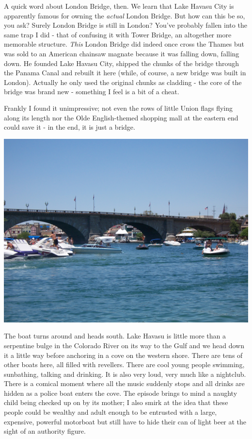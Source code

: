 \documentclass[a5paper,titlepage,11pt,draft]{book}
\begin{document}
A quick word about London Bridge, then.  We learn that Lake Havasu City is apparently famous for owning the \emph{actual} London Bridge.  But how can this be so, you ask?  Surely London Bridge is still in London?  You've probably fallen into the same trap I did - that of confusing it with Tower Bridge, an altogether more memorable structure.  \emph{This} London Bridge did indeed once cross the Thames but was sold to an American chainsaw magnate because it was falling down, falling down.  He founded Lake Havasu City, shipped the chunks of the bridge through the Panama Canal and rebuilt it here (while, of course, a new bridge was built in London).  Actually he only used the original chunks as cladding - the core of the bridge was brand new - something I feel is a bit of a cheat.

Frankly I found it unimpressive; not even the rows of little Union flags flying along its length nor the Olde English-themed shopping mall at the eastern end could save it - in the end, it is just a bridge.

\begin{center}\includegraphics[width=\textwidth]{gfx/100_1598}\end{center}

The boat turns around and heads south.  Lake Havasu is little more than a serpentine bulge in the Colorado River on its way to the Gulf and we head down it a little way before anchoring in a cove on the western shore.  There are tens of other boats here, all filled with revellers.  There are cool young people swimming, sunbathing, talking and drinking.  It is also very loud, very much like a nightclub.  There is a comical moment where all the music suddenly stops and all drinks are hidden as a police boat enters the cove.  The episode brings to mind a naughty child being checked up on by its mother; I also smirk at the idea that these people could be wealthy and adult enough to be entrusted with a large, expensive, powerful motorboat but still have to hide their can of light beer at the sight of an authority figure.
\end{document}
